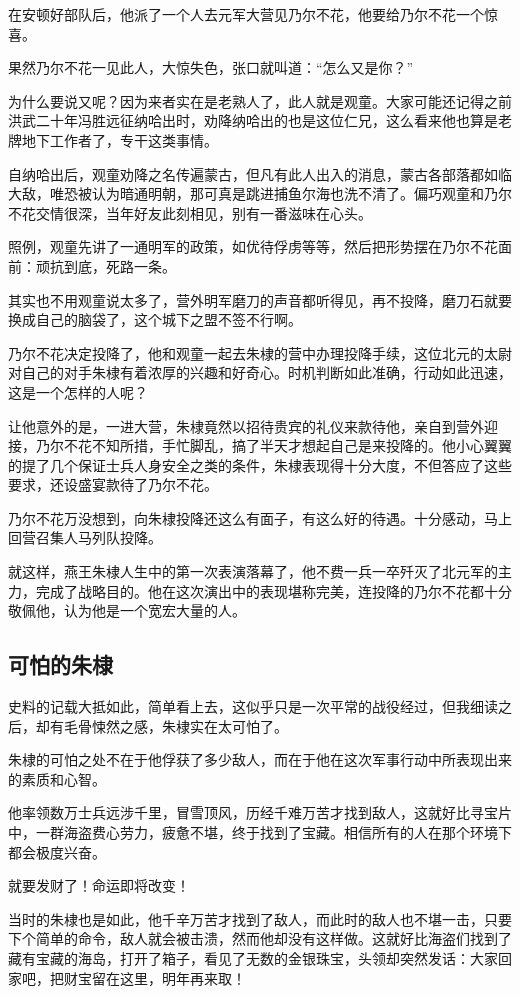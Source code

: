 \begin{multicols}{\theparacolNo}
		在安顿好部队后，他派了一个人去元军大营见乃尔不花，他要给乃尔不花一个惊喜。

		果然乃尔不花一见此人，大惊失色，张口就叫道：“怎么又是你？”

		为什么要说又呢？因为来者实在是老熟人了，此人就是观童。大家可能还记得之前洪武二十年冯胜远征纳哈出时，劝降纳哈出的也是这位仁兄，这么看来他也算是老牌地下工作者了，专干这类事情。

		自纳哈出后，观童劝降之名传遍蒙古，但凡有此人出入的消息，蒙古各部落都如临大敌，唯恐被认为暗通明朝，那可真是跳进捕鱼尔海也洗不清了。偏巧观童和乃尔不花交情很深，当年好友此刻相见，别有一番滋味在心头。

		照例，观童先讲了一通明军的政策，如优待俘虏等等，然后把形势摆在乃尔不花面前：顽抗到底，死路一条。

		其实也不用观童说太多了，营外明军磨刀的声音都听得见，再不投降，磨刀石就要换成自己的脑袋了，这个城下之盟不签不行啊。

		乃尔不花决定投降了，他和观童一起去朱棣的营中办理投降手续，这位北元的太尉对自己的对手朱棣有着浓厚的兴趣和好奇心。时机判断如此准确，行动如此迅速，这是一个怎样的人呢？

		让他意外的是，一进大营，朱棣竟然以招待贵宾的礼仪来款待他，亲自到营外迎接，乃尔不花不知所措，手忙脚乱，搞了半天才想起自己是来投降的。他小心翼翼的提了几个保证士兵人身安全之类的条件，朱棣表现得十分大度，不但答应了这些要求，还设盛宴款待了乃尔不花。

		乃尔不花万没想到，向朱棣投降还这么有面子，有这么好的待遇。十分感动，马上回营召集人马列队投降。

		就这样，燕王朱棣人生中的第一次表演落幕了，他不费一兵一卒歼灭了北元军的主力，完成了战略目的。他在这次演出中的表现堪称完美，连投降的乃尔不花都十分敬佩他，认为他是一个宽宏大量的人。

		\subsection{可怕的朱棣}
		史料的记载大抵如此，简单看上去，这似乎只是一次平常的战役经过，但我细读之后，却有毛骨悚然之感，朱棣实在太可怕了。

		朱棣的可怕之处不在于他俘获了多少敌人，而在于他在这次军事行动中所表现出来的素质和心智。

		他率领数万士兵远涉千里，冒雪顶风，历经千难万苦才找到敌人，这就好比寻宝片中，一群海盗费心劳力，疲惫不堪，终于找到了宝藏。相信所有的人在那个环境下都会极度兴奋。

		就要发财了！命运即将改变！

		当时的朱棣也是如此，他千辛万苦才找到了敌人，而此时的敌人也不堪一击，只要下个简单的命令，敌人就会被击溃，然而他却没有这样做。这就好比海盗们找到了藏有宝藏的海岛，打开了箱子，看见了无数的金银珠宝，头领却突然发话：大家回家吧，把财宝留在这里，明年再来取！


\end{multicols}

